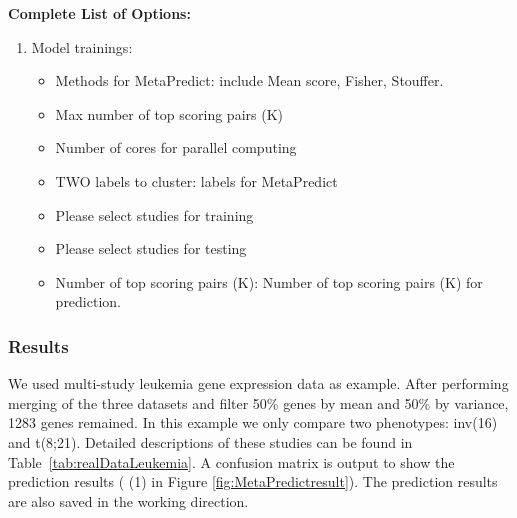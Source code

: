 \textbf{Complete List of Options:} 
\begin{enumerate}
\item Model trainings: 
\begin{itemize}
\item Methods for MetaPredict: include Mean score, Fisher, Stouffer.
\item Max number of top scoring pairs (K)
\item Number of cores for parallel computing
\item TWO labels to cluster: labels for MetaPredict
\item Please select studies for training
\item Please select studies for testing
\item Number of top scoring pairs (K): Number of top scoring pairs (K) for prediction.
\end{itemize}

\end{enumerate}

\subsubsection{Results}

We used multi-study leukemia gene expression data as example.
After performing merging of the three datasets and filter 50\% genes by mean and 50\% by variance, 1283 genes remained.
In this example we only compare two phenotypes: inv(16) and t(8;21). 
Detailed descriptions of these studies can be found in Table~\ref{tab:realDataLeukemia}. 
A confusion matrix is output to show the prediction results ({\color{red} (1)} in Figure \ref{fig:MetaPredictresult}).
The prediction results are also saved in the working direction.

